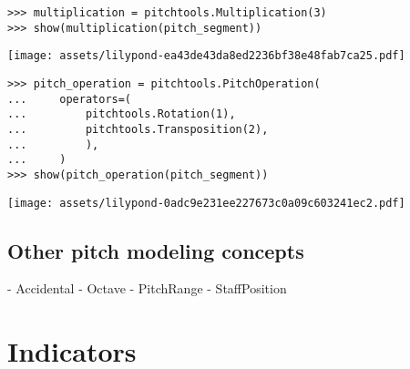 \begin{comment}
<abjad>
multiplication = pitchtools.Multiplication(3)
show(multiplication(pitch_segment))
</abjad>
\end{comment}

\begin{singlespacing}
\vspace{-0.5\baselineskip}
\begin{lstlisting}
>>> multiplication = pitchtools.Multiplication(3)
>>> show(multiplication(pitch_segment))
\end{lstlisting}
\noindent\texttt{[image: assets/lilypond-ea43de43da8ed2236bf38e48fab7ca25.pdf]}
\end{singlespacing}

\begin{comment}
<abjad>
pitch_operation = pitchtools.PitchOperation(
    operators=(
        pitchtools.Rotation(1),
        pitchtools.Transposition(2),
        ),
    )
show(pitch_operation(pitch_segment))
</abjad>
\end{comment}

\begin{singlespacing}
\vspace{-0.5\baselineskip}
\begin{lstlisting}
>>> pitch_operation = pitchtools.PitchOperation(
...     operators=(
...         pitchtools.Rotation(1),
...         pitchtools.Transposition(2),
...         ),
...     )
>>> show(pitch_operation(pitch_segment))
\end{lstlisting}
\noindent\texttt{[image: assets/lilypond-0adc9e231ee227673c0a09c603241ec2.pdf]}
\end{singlespacing}

\subsection{Other pitch modeling concepts}

\begin{markdown}
- Accidental
- Octave
- PitchRange
- StaffPosition
\end{markdown}

\section{Indicators}

